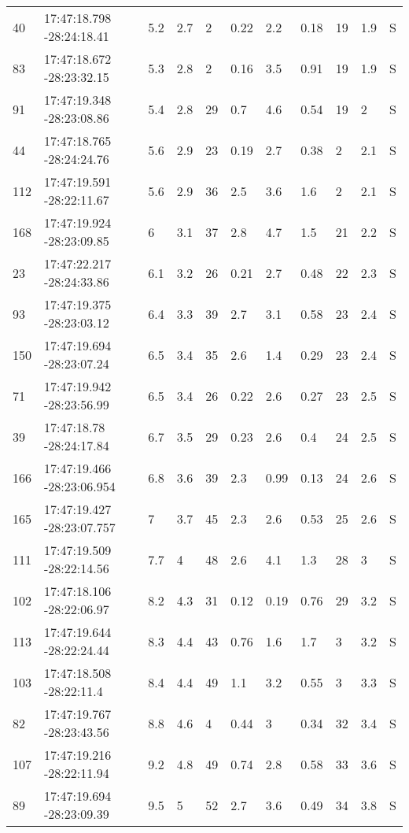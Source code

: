 \begin{deluxetable}[htp]
\begin{tabular}{lllllllllll}
40 & 17:47:18.798 -28:24:18.41 & 5.2 & 2.7 & 2 & 0.22 & 2.2 & 0.18 & 19 & 1.9\ee{25} & S \\
83 & 17:47:18.672 -28:23:32.15 & 5.3 & 2.8 & 2 & 0.16 & 3.5 & 0.91 & 19 & 1.9\ee{25} & S \\
91 & 17:47:19.348 -28:23:08.86 & 5.4 & 2.8 & 29 & 0.7 & 4.6 & 0.54 & 19 & 2\ee{25} & S \\
44 & 17:47:18.765 -28:24:24.76 & 5.6 & 2.9 & 23 & 0.19 & 2.7 & 0.38 & 2 & 2.1\ee{25} & S \\
112 & 17:47:19.591 -28:22:11.67 & 5.6 & 2.9 & 36 & 2.5 & 3.6 & 1.6 & 2 & 2.1\ee{25} & S \\
168 & 17:47:19.924 -28:23:09.85 & 6 & 3.1 & 37 & 2.8 & 4.7 & 1.5 & 21 & 2.2\ee{25} & S \\
23 & 17:47:22.217 -28:24:33.86 & 6.1 & 3.2 & 26 & 0.21 & 2.7 & 0.48 & 22 & 2.3\ee{25} & S \\
93 & 17:47:19.375 -28:23:03.12 & 6.4 & 3.3 & 39 & 2.7 & 3.1 & 0.58 & 23 & 2.4\ee{25} & S \\
150 & 17:47:19.694 -28:23:07.24 & 6.5 & 3.4 & 35 & 2.6 & 1.4 & 0.29 & 23 & 2.4\ee{25} & S \\
71 & 17:47:19.942 -28:23:56.99 & 6.5 & 3.4 & 26 & 0.22 & 2.6 & 0.27 & 23 & 2.5\ee{25} & S \\
39 & 17:47:18.78 -28:24:17.84 & 6.7 & 3.5 & 29 & 0.23 & 2.6 & 0.4 & 24 & 2.5\ee{25} & S \\
166 & 17:47:19.466 -28:23:06.954 & 6.8 & 3.6 & 39 & 2.3 & 0.99 & 0.13 & 24 & 2.6\ee{25} & S \\
165 & 17:47:19.427 -28:23:07.757 & 7 & 3.7 & 45 & 2.3 & 2.6 & 0.53 & 25 & 2.6\ee{25} & S \\
111 & 17:47:19.509 -28:22:14.56 & 7.7 & 4 & 48 & 2.6 & 4.1 & 1.3 & 28 & 3\ee{25} & S \\
102 & 17:47:18.106 -28:22:06.97 & 8.2 & 4.3 & 31 & 0.12 & 0.19 & 0.76 & 29 & 3.2\ee{25} & S \\
113 & 17:47:19.644 -28:22:24.44 & 8.3 & 4.4 & 43 & 0.76 & 1.6 & 1.7 & 3 & 3.2\ee{25} & S \\
103 & 17:47:18.508 -28:22:11.4 & 8.4 & 4.4 & 49 & 1.1 & 3.2 & 0.55 & 3 & 3.3\ee{25} & S \\
82 & 17:47:19.767 -28:23:43.56 & 8.8 & 4.6 & 4 & 0.44 & 3 & 0.34 & 32 & 3.4\ee{25} & S \\
107 & 17:47:19.216 -28:22:11.94 & 9.2 & 4.8 & 49 & 0.74 & 2.8 & 0.58 & 33 & 3.6\ee{25} & S \\
89 & 17:47:19.694 -28:23:09.39 & 9.5 & 5 & 52 & 2.7 & 3.6 & 0.49 & 34 & 3.8\ee{25} & S \\

\end{tabular}
\end{deluxetable}
